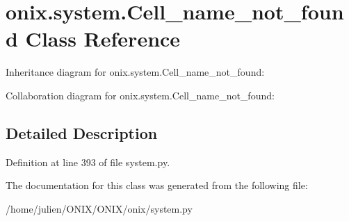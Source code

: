 \hypertarget{classonix_1_1system_1_1Cell__name__not__found}{}\section{onix.\+system.\+Cell\+\_\+name\+\_\+not\+\_\+found Class Reference}
\label{classonix_1_1system_1_1Cell__name__not__found}


Inheritance diagram for onix.\+system.\+Cell\+\_\+name\+\_\+not\+\_\+found\+:


Collaboration diagram for onix.\+system.\+Cell\+\_\+name\+\_\+not\+\_\+found\+:


\subsection{Detailed Description}


Definition at line 393 of file system.\+py.



The documentation for this class was generated from the following file\+:\begin{DoxyCompactItemize}
\item 
/home/julien/\+O\+N\+I\+X/\+O\+N\+I\+X/onix/system.\+py\end{DoxyCompactItemize}
